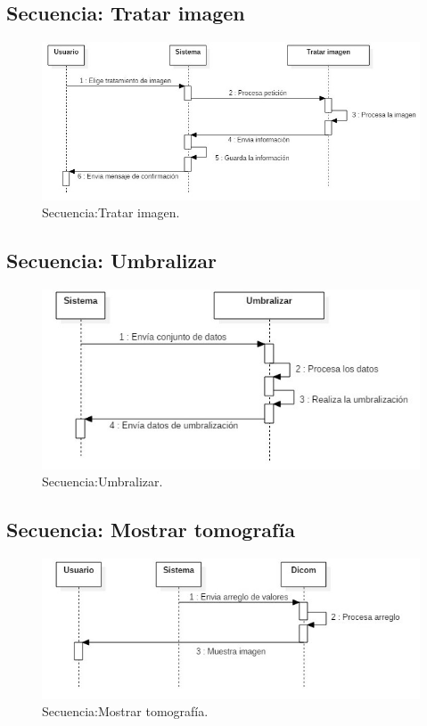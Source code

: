 \documentclass[12pt]{report}
\begin{document}
\subsection{Secuencia: Tratar imagen}
\begin{figure}[H]
\centering
\includegraphics[width = 12 cm, height = 7 cm]{tratamiento}
\caption{Secuencia:Tratar imagen.}
\end{figure}

\subsection{Secuencia: Umbralizar}
\begin{figure}[H]
\centering
\includegraphics[width = 12 cm, height = 7 cm]{umbralizacion}
\caption{Secuencia:Umbralizar.}
\end{figure}

\subsection{Secuencia: Mostrar tomografía}
\begin{figure}[H]
\centering
\includegraphics[width = 12 cm, height = 7 cm]{mostrar_tomografia}
\caption{Secuencia:Mostrar tomografía.}
\end{figure}



\end{document}
